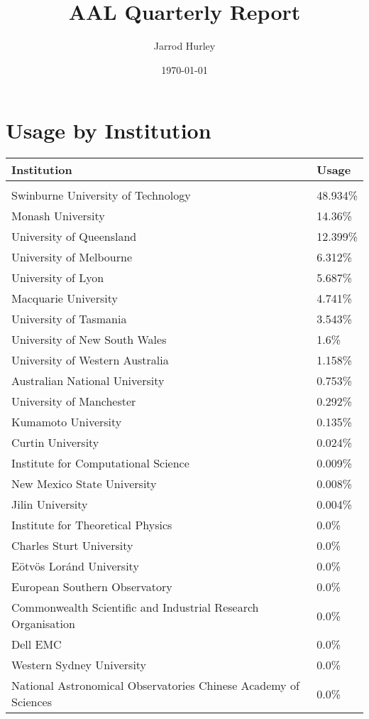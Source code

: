 \documentclass{article}%
\title{AAL Quarterly Report}%
\author{Jarrod Hurley}%
\date{\today}%
\begin{document}
%
\normalsize%
\maketitle%
\newpage%
\section{Usage by Institution }%

%
\begin{longtabu}{X[l] X[r]}%
\textbf{Institution}&\textbf{Usage}\\%
\hline%
&\\%
Swinburne University of Technology&48.934\%\\%
\hline%
Monash University&14.36\%\\%
\hline%
University of Queensland&12.399\%\\%
\hline%
University of Melbourne&6.312\%\\%
\hline%
University of Lyon&5.687\%\\%
\hline%
Macquarie University&4.741\%\\%
\hline%
University of Tasmania&3.543\%\\%
\hline%
University of New South Wales&1.6\%\\%
\hline%
University of Western Australia&1.158\%\\%
\hline%
Australian National University&0.753\%\\%
\hline%
University of Manchester&0.292\%\\%
\hline%
Kumamoto University&0.135\%\\%
\hline%
Curtin University&0.024\%\\%
\hline%
Institute for Computational Science&0.009\%\\%
\hline%
New Mexico State University&0.008\%\\%
\hline%
Jilin University&0.004\%\\%
\hline%
Institute for Theoretical Physics&0.0\%\\%
\hline%
Charles Sturt University&0.0\%\\%
\hline%
Eötvös Loránd University&0.0\%\\%
\hline%
European Southern Observatory&0.0\%\\%
\hline%
Commonwealth Scientific and Industrial Research Organisation&0.0\%\\%
\hline%
Dell EMC&0.0\%\\%
\hline%
Western Sydney University&0.0\%\\%
\hline%
National Astronomical Observatories Chinese Academy of Sciences&0.0\%\\%

\end{longtabu}
\end{document}
